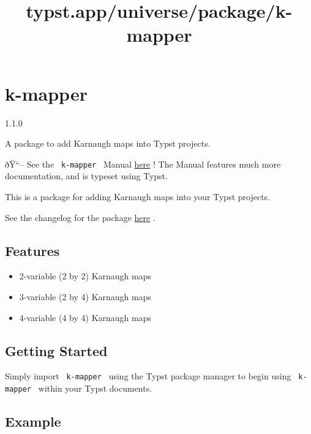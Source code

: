 \title{typst.app/universe/package/k-mapper}

\label{banner}
\section{k-mapper}\label{k-mapper}

{ 1.1.0 }

A package to add Karnaugh maps into Typst projects.

\label{readme}
ðŸ``-- See the \texttt{\ k-mapper\ } Manual
\href{https://github.com/derekchai/k-mapper/blob/1f334d9e0f02cc656c01835302474bf728db9f80/manual.pdf}{here}
! The Manual features much more documentation, and is typeset using
Typst.

This is a package for adding Karnaugh maps into your Typst projects.

See the changelog for the package
\href{https://github.com/derekchai/k-mapper/blob/698e8554ce67e3a61dd30319ab8f712a6a6b8daa/changelog.md}{here}
.

\subsection{Features}\label{features}

\begin{itemize}
\tightlist
\item
  2-variable (2 by 2) Karnaugh maps
\item
  3-variable (2 by 4) Karnaugh maps
\item
  4-variable (4 by 4) Karnaugh maps
\end{itemize}

\subsection{Getting Started}\label{getting-started}

Simply import \texttt{\ k-mapper\ } using the Typst package manager to
begin using \texttt{\ k-mapper\ } within your Typst documents.

\begin{Shaded}
\begin{Highlighting}[]
\end{Highlighting}
\end{Shaded}

\subsection{Example}\label{example}

